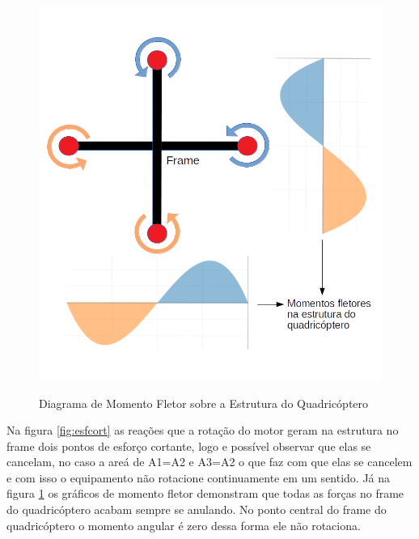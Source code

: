 \begin{figure}[htpb]
  \centering
  \caption{Diagrama de Momento Fletor sobre a Estrutura do Quadricóptero}
  \includegraphics[scale=.3]{figs/momfletor.png}
  \label{fig:momflet}
\end{figure}

Na figura \ref{fig:esfcort} as reações que a rotação do motor geram na estrutura no frame dois pontos de esforço cortante, logo e possível observar que elas se cancelam, no caso a areá de  A1=A2 e A3=A2 o que faz com que elas se cancelem e com isso o equipamento não rotacione continuamente em um sentido. Já na figura \ref{fig:momflet} os gráficos de momento fletor demonstram que todas as forças no frame do quadricóptero acabam sempre se anulando. No ponto central do frame do quadricóptero o momento angular é zero dessa forma ele não rotaciona\cite{momesf}. 


